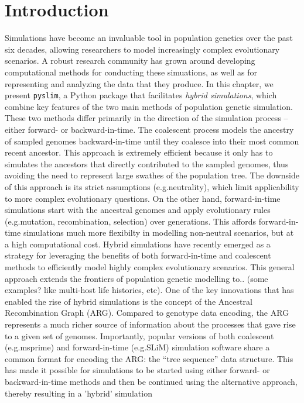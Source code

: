 \documentclass[12pt]{article}
\newcommand{\pyslim}[0]{\texttt{pyslim}\xspace}
\newcommand*{\eg}{e.g.\xcomma}
\begin{document}
\section*{Introduction}
Simulations have become an invaluable tool in population genetics over the past six decades,
allowing researchers to model increasingly complex evolutionary scenarios.
A robust research community has grown around developing computational methods for conducting these
simuations, as well as for representing and analyzing the data that they produce.
In this chapter, we present \pyslim, a Python package that facilitates \emph{hybrid simulations}, which combine key
features of the two main methods of population genetic simulation. These two methods differ primarily in the direction of the simulation
process -- either forward- or backward-in-time. The coalescent process models the ancestry of sampled genomes
backward-in-time until they coalesce into their most common recent ancestor. %
This approach is extremely efficient because it only has to simulates the ancestors that directly contributed to the sampled genomes,
thus avoiding the need to represent large swathes of the population tree. The downside of this approach is its strict assumptions
(\eg neutrality), which limit applicability to more complex evolutionary questions. On the other hand, forward-in-time simulations
start with the ancestral genomes and apply evolutionary rules (\eg mutation, recombination, selection) over generations.
This affords forward-in-time simulations much more flexibilty in modelling non-neutral scenarios, but at a high computational cost.
Hybrid simulations have recently emerged as a strategy for leveraging the benefits of both forward-in-time and coalescent methods
to efficiently model highly complex evolutionary scenarios. This general approach extends the frontiers of population genetic modelling to..
(some examples? like multi-host life histories, etc).
One of the key innovations that has enabled the rise of hybrid simulations is the concept of the Ancestral Recombination Graph (ARG).
Compared to genotype data encoding, the ARG represents a much richer source of information about the processes that gave rise
to a given set of genomes. Importantly, popular versions of both coalescent (\eg msprime) and forward-in-time (\eg SLiM) simulation software share a common format for
encoding the ARG: the ``tree sequence'' data structure. This has made it possible for simulations to be started using either forward- or backward-in-time
methods and then be continued using the alternative approach, thereby resulting in a 'hybrid' simulation
\end{document}
